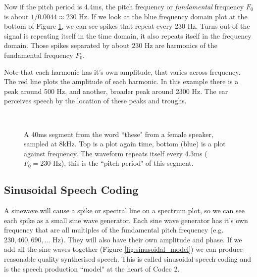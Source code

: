 \documentclass{article}
\begin{document}
Now if the pitch period is 4.4ms, the pitch frequency or \emph{fundamental} frequency $F_0$ is about $1/0.0044 \approx 230$ Hz.  If we look at the blue frequency domain plot at the bottom of Figure \ref{fig:hts2a_time}, we can see spikes that repeat every 230 Hz.  Turns out of the signal is repeating itself in the time domain, it also repeats itself in the frequency domain.  Those spikes separated by about 230 Hz are harmonics of the fundamental frequency $F_0$.

Note that each harmonic has it's own amplitude, that varies across frequency.  The red line plots the amplitude of each harmonic. In this example there is a peak around 500 Hz, and another, broader peak around 2300 Hz.  The ear perceives speech by the location of these peaks and troughs.

\begin{figure}
\caption{ A 40ms segment from the word ``these" from a female speaker, sampled at 8kHz. Top is a plot again time, bottom (blue) is a plot against frequency. The waveform repeats itself every 4.3ms ($F_0=230$ Hz), this is the ``pitch period" of this segment.}
\label{fig:hts2a_time}
\begin{center}

\\

\end{center}
\end{figure}

\subsection{Sinusoidal Speech Coding}

A sinewave will cause a spike or spectral line on a spectrum plot, so we can see each spike as a small sine wave generator.  Each sine wave generator has it's own frequency that are all multiples of the fundamental pitch frequency (e.g. $230, 460, 690,...$ Hz).  They will also have their own amplitude and phase.  If we add all the sine waves together (Figure \ref{fig:sinusoidal_model}) we can produce reasonable quality synthesised speech.  This is called sinusoidal speech coding and is the speech production ``model" at the heart of Codec 2.
\end{document}
